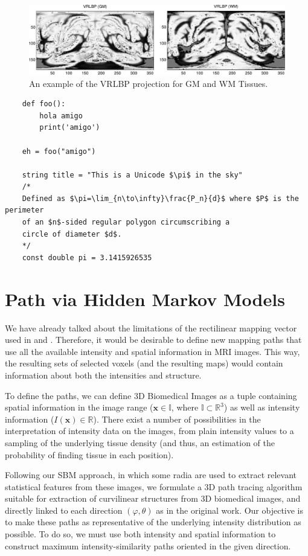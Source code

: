 \begin{figure}[htp]
	\centering
	\includegraphics[width=\textwidth]{gfx/ch6/04-vrlbp}
	\caption{An example of the VRLBP projection for \ac{GM} and \ac{WM} Tissues. }
	\label{fig:vrlbp}
\end{figure}


\lstset{language=python} 
\begin{lstlisting}
	def foo():
		hola amigo
		print('amigo')
	
	eh = foo("amigo")
	
	string title = "This is a Unicode $\pi$ in the sky"
	/*
	Defined as $\pi=\lim_{n\to\infty}\frac{P_n}{d}$ where $P$ is the perimeter
	of an $n$-sided regular polygon circumscribing a
	circle of diameter $d$.
	*/
	const double pi = 3.1415926535
\end{lstlisting}

\section{Path via Hidden Markov Models}
We have already talked about the limitations of the rectilinear mapping vector used in \cite{Martinez-Murcia2015} and \cite{Martinez-MurciaVRLBP}. Therefore, it would be desirable to define new mapping paths that use all the available intensity and spatial information in MRI images. This way, the resulting sets of selected voxels (and the resulting maps) would contain information about both the intensities and structure.

To define the paths, we can define 3D Biomedical Images as a tuple containing spatial information in the image range ($\mathbf{x} \in \mathbb{I}$, where $\mathbb{I}\subset \mathbb{R}^3$) as well as intensity information ($I(\mathbf{x}) \in \mathbb{R}$). There exist a number of possibilities in the interpretation of intensity data on the images, from plain intensity values to a sampling of the underlying tissue density (and thus, an estimation of the probability of finding tissue in each position). 

Following our \ac{SBM} approach, in which some radia are used to extract relevant statistical features from these images, we formulate a 3D path tracing algorithm suitable for extraction of curvilinear structures from 3D biomedical images, and directly linked to each direction $(\varphi,\theta)$ as in the original work. Our objective is to make these paths as representative of the underlying intensity distribution as possible. To do so, we must use both intensity and spatial information to construct maximum intensity-similarity paths oriented in the given direction. 

